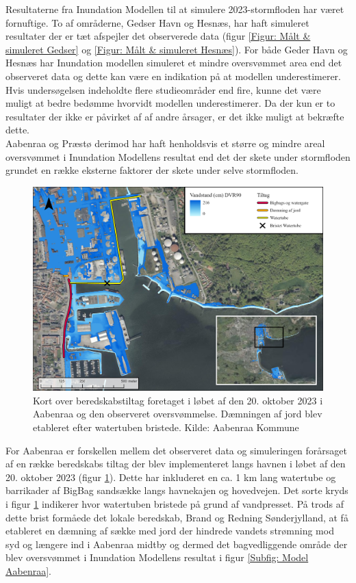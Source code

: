 Resultaterne fra Inundation Modellen til at simulere 2023-stormfloden har været fornuftige. To af områderne, Gedser Havn og Hesnæs, har haft simuleret resultater der er tæt afspejler det observerede data (figur \ref{Figur: Målt & simuleret Gedser} og \ref{Figur: Målt & simuleret Hesnæs}). For både Geder Havn og Hesnæs har Inundation modellen simuleret et mindre oversvømmet area end det observeret data og dette kan være en indikation på at modellen underestimerer. Hvis undersøgelsen indeholdte flere studieområder end fire, kunne det være muligt at bedre bedømme hvorvidt modellen underestimerer. Da der kun er to resultater der ikke er påvirket af af andre årsager, er det ikke muligt at bekræfte dette.\\
Aabenraa og Præstø derimod har haft henholdsvis et større og mindre areal oversvømmet i Inundation Modellens resultat end det der skete under stormfloden grundet en række eksterne faktorer der skete under selve stormfloden.
\begin{figure}[H]
    \centering
    \includegraphics[width=0.8\linewidth]{images/diskussion/beredskabstiltag.jpg}
    \caption{Kort over beredskabstiltag foretaget i løbet af den 20. oktober 2023 i Aabenraa og den observeret oversvømmelse. Dæmningen af jord blev etableret efter watertuben bristede. Kilde: Aabenraa Kommune}
    \label{Figur: Beredskabstiltag}
\end{figure}
For Aabenraa er forskellen mellem det observeret data og simuleringen forårsaget af en række beredskabs tiltag der blev implementeret langs havnen i løbet af den 20. oktober 2023 (figur \ref{Figur: Beredskabstiltag}). Dette har inkluderet en ca. 1 km lang watertube og barrikader af BigBag sandsække langs havnekajen og hovedvejen. Det sorte kryds i figur \ref{Figur: Beredskabstiltag} indikerer hvor watertuben bristede på grund af vandpresset. På trods af dette brist formåede det lokale beredskab, Brand og Redning Sønderjylland, at få etableret en dæmning af sække med jord der hindrede vandets strømning mod syd og længere ind i Aabenraa midtby og dermed det bagvedliggende område der blev oversvømmet i Inundation Modellens resultat i figur \ref{Subfig: Model Aabenraa}.\\

